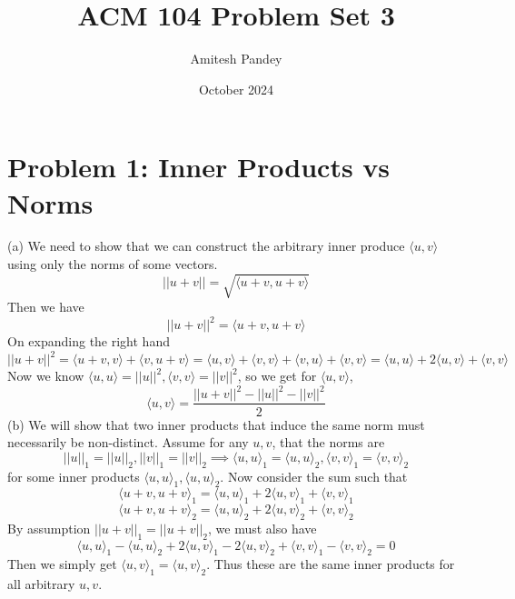 \documentclass{article}
\title{ACM 104 Problem Set 3}
\author{Amitesh Pandey}
\date{October 2024}
\begin{document}
\maketitle
\section*{Problem 1: Inner Products vs Norms}
(a) We need to show that we can construct the arbitrary inner produce $\langle u, v\rangle$ using only the norms of some vectors. 
\begin{equation*}
    ||u + v|| = \sqrt{\langle u + v, u + v \rangle}
\end{equation*}
Then we have
\begin{equation*}
    ||u + v||^2 = \langle u + v, u + v \rangle
\end{equation*}
On expanding the right hand
\begin{equation*}
    ||u + v||^2 = \langle u + v, v \rangle + \langle v, u + v \rangle = \langle u, v\rangle + \langle v, v\rangle + \langle v, u\rangle + \langle v, v \rangle = \langle u, u\rangle + 2\langle u, v \rangle + \langle v, v \rangle
\end{equation*}
Now we know $\langle u, u\rangle = ||u||^2, \langle v, v \rangle = ||v||^2$, so we get for $\langle u, v \rangle$, 
\begin{equation*}
    \langle u, v \rangle = \frac{||u + v||^2 - ||u||^2 - ||v||^2}{2}
\end{equation*}
(b) We will show that two inner products that induce the same norm must necessarily be non-distinct. Assume for any $u,v$, that the norms are
\begin{equation*}
    ||u||_{1} = ||u||_{2}, ||v||_{1} = ||v||_{2} \implies \langle u, u\rangle_{1} = \langle u, u\rangle_{2},\langle v, v\rangle_{1} = \langle v, v\rangle_{2}
\end{equation*}
for some inner products $\langle u, u \rangle_{1},\langle u, u\rangle_{2}$. Now consider the sum such that
\begin{equation*}
    \langle u + v, u + v \rangle_{1} = \langle u, u\rangle_{1} + 2\langle u, v \rangle_{1} + \langle v, v \rangle_{1}
\end{equation*}
\begin{equation*}
    \langle u + v, u + v \rangle_{2} =  \langle u, u\rangle_{2} + 2\langle u, v \rangle_{2} + \langle v, v \rangle_{2}
\end{equation*}
By assumption $||u+v||_{1} = ||u+v||_{2}$, we must also have
\begin{equation*}
    \langle u, u\rangle_{1} - \langle u, u\rangle_{2} + 2\langle u,v\rangle_{1} - 2\langle u, v\rangle_{2} + \langle v, v\rangle_{1} - \langle v, v\rangle_{2} = 0
\end{equation*}
Then we simply get $\langle u, v\rangle_{1} = \langle u, v\rangle_{2}$. Thus these are the same inner products for all arbitrary $u,v$.
\newpage
\end{document}
